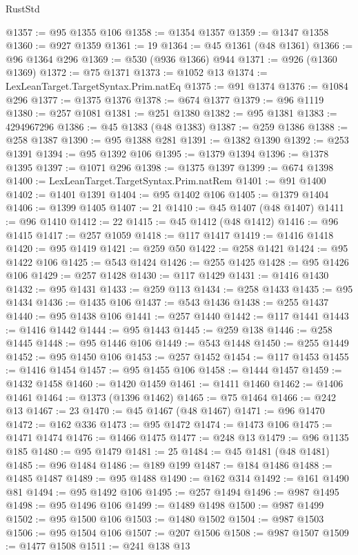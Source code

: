 \begin{lexlean}{RustStd}
\begin{coremodule}
@1357 := @95 @1355 @106
@1358 := @1354 @1357
@1359 := @1347 @1358
@1360 := @927 @1359
@1361 := 19
@1364 := @45 @1361 (@48 @1361)
@1366 := @96 @1364 @296
@1369 := @530 (@936 @1366) @944
@1371 := @926 (@1360 @1369)
@1372 := @75 @1371
@1373 := @1052 @13
@1374 := LexLeanTarget.TargetSyntax.Prim.natEq
@1375 := @91 @1374
@1376 := @1084 @296
@1377 := @1375 @1376
@1378 := @674 @1377
@1379 := @96 @1119
@1380 := @257 @1081
@1381 := @251 @1380
@1382 := @95 @1381
@1383 := 4294967296
@1386 := @45 @1383 (@48 @1383)
@1387 := @259 @1386
@1388 := @258 @1387
@1390 := @95 @1388 @281
@1391 := @1382 @1390
@1392 := @253 @1391
@1394 := @95 @1392 @106
@1395 := @1379 @1394
@1396 := @1378 @1395
@1397 := @1071 @296
@1398 := @1375 @1397
@1399 := @674 @1398
@1400 := LexLeanTarget.TargetSyntax.Prim.natRem
@1401 := @91 @1400
@1402 := @1401 @1391
@1404 := @95 @1402 @106
@1405 := @1379 @1404
@1406 := @1399 @1405
@1407 := 21
@1410 := @45 @1407 (@48 @1407)
@1411 := @96 @1410
@1412 := 22
@1415 := @45 @1412 (@48 @1412)
@1416 := @96 @1415
@1417 := @257 @1059
@1418 := @117 @1417
@1419 := @1416 @1418
@1420 := @95 @1419
@1421 := @259 @50
@1422 := @258 @1421
@1424 := @95 @1422 @106
@1425 := @543 @1424
@1426 := @255 @1425
@1428 := @95 @1426 @106
@1429 := @257 @1428
@1430 := @117 @1429
@1431 := @1416 @1430
@1432 := @95 @1431
@1433 := @259 @113
@1434 := @258 @1433
@1435 := @95 @1434
@1436 := @1435 @106
@1437 := @543 @1436
@1438 := @255 @1437
@1440 := @95 @1438 @106
@1441 := @257 @1440
@1442 := @117 @1441
@1443 := @1416 @1442
@1444 := @95 @1443
@1445 := @259 @138
@1446 := @258 @1445
@1448 := @95 @1446 @106
@1449 := @543 @1448
@1450 := @255 @1449
@1452 := @95 @1450 @106
@1453 := @257 @1452
@1454 := @117 @1453
@1455 := @1416 @1454
@1457 := @95 @1455 @106
@1458 := @1444 @1457
@1459 := @1432 @1458
@1460 := @1420 @1459
@1461 := @1411 @1460
@1462 := @1406 @1461
@1464 := @1373 (@1396 @1462)
@1465 := @75 @1464
@1466 := @242 @13
@1467 := 23
@1470 := @45 @1467 (@48 @1467)
@1471 := @96 @1470
@1472 := @162 @336
@1473 := @95 @1472
@1474 := @1473 @106
@1475 := @1471 @1474
@1476 := @1466 @1475
@1477 := @248 @13
@1479 := @96 @1135 @185
@1480 := @95 @1479
@1481 := 25
@1484 := @45 @1481 (@48 @1481)
@1485 := @96 @1484
@1486 := @189 @199
@1487 := @184 @1486
@1488 := @1485 @1487
@1489 := @95 @1488
@1490 := @162 @314
@1492 := @161 @1490 @81
@1494 := @95 @1492 @106
@1495 := @257 @1494
@1496 := @987 @1495
@1498 := @95 @1496 @106
@1499 := @1489 @1498
@1500 := @987 @1499
@1502 := @95 @1500 @106
@1503 := @1480 @1502
@1504 := @987 @1503
@1506 := @95 @1504 @106
@1507 := @207 @1506
@1508 := @987 @1507
@1509 := @1477 @1508
@1511 := @241 @138 @13

\end{coremodule}
\end{lexlean}
